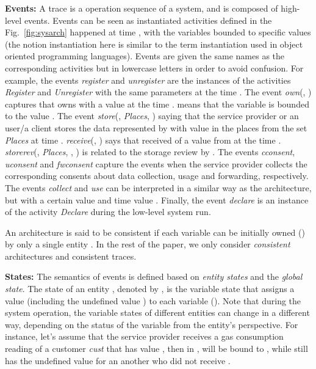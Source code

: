 \documentclass[a4paper]{article}
\begin{document}
\textbf{Events:}  A trace is a operation sequence of a system, and is composed of high-level events. Events can be seen as instantiated activities defined in the Fig.~\ref{fig:sysarch} happened at time , with the variables bounded to specific values (the notion instantiation here is  similar to the term instantiation used in object oriented programming languages). Events are given the same names as the corresponding activities but in lowercase letters in order to avoid confusion.  For example, the events \textit{register} and \textit{unregister} are the instances of the activities  \textit{Register} and \textit{Unregister} with the same parameters at the time . The event \textit{own}(, ) captures  that  owns  with a value  at the time .  means that the variable  is bounded to the value . The event \textit{store}(, \textit{Places}, ) saying that the service provider or an user/a client stores the data represented by  with value  in the places from the set \textit{Places} at time .  \textit{receive}(, ) says that  received  of a value  from  at the time . \textit{storerev}(, \textit{Places}, , ) is related to the storage review by .  The events \textit{cconsent}, \textit{uconsent} and \textit{fwconsent} capture the events when the service provider collects the corresponding consents about data collection, usage and forwarding, respectively. The events \textit{collect} and \textit{use} can be interpreted in a similar way as the architecture, but with a certain value  and time value . 
Finally, the event \textit{declare} is an instance of the activity \textit{Declare} during the low-level system run.

An architecture is said to be consistent if each variable can be initially owned () by only a single entity . In the rest of the paper,  we only consider \textit{consistent} architectures and consistent traces. 


\textbf{States:} The semantics of events is defined based on \textit{entity states} and the \textit{global state}. The state of an entity , denoted by , is the variable state that assigns a value (including the undefined value ) to each variable (). Note that during the system operation, the variable states of different entities can change in a different way, depending on the status of the variable from the entity's perspective. For instance, let's assume that the service provider  receives a gas consumption reading  of a customer \textit{cust} that has value , then in  ,  will be bound to , while  still has the undefined value for an another  who did not receive . 
\end{document}
